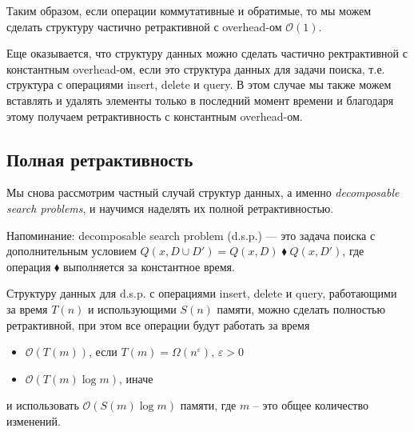 Таким образом, если операции коммутативные и обратимые, то мы можем сделать структуру частично ретрактивной с overhead-ом $\mathcal{O}(1)$.

Еще оказывается, что структуру данных можно сделать частично ректрактивной с константным overhead-ом, если это структура данных для задачи поиска, 
т.е. структура с операциями insert, delete и query.
В этом случае мы также можем вставлять и удалять элементы только в последний момент времени и благодаря этому получаем ретрактивность с константным overhead-ом.


\subsection*{Полная ретрактивность}

Мы снова рассмотрим частный случай структур данных, а именно {\it decomposable search problems}, и научимся наделять их полной ретрактивностью. 

Напоминание: decomposable search problem (d.s.p.) --- это задача поиска с дополнительным условием $Q(x, D \cup D') = Q(x, D) \; \blacklozenge \; Q(x, D')$, 
где операция $\blacklozenge$ выполняется за константное время.

\begin{theorem} 

Структуру данных для d.s.p. с операциями insert, delete и query, работающими за время $T(n)$ и использующими $S(n)$ памяти, можно сделать полностью ретрактивной,
при этом все операции будут работать за время

\end{theorem}

\begin{itemize}

\item $\mathcal{O}(T(m))$, если $T(m) = \Omega(n^{\varepsilon})$, $\varepsilon > 0$
\item $\mathcal{O}(T(m) \log m)$, иначе

\end{itemize}

и использовать $\mathcal{O}(S(m) \log m)$ памяти, где $m$ -- это общее количество изменений.

